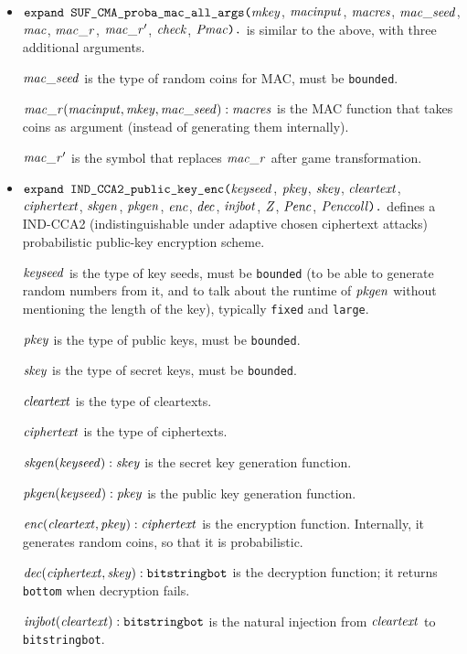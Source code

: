 \documentclass{article}
\begin{document}
\begin{itemize}
\item $\texttt{expand SUF\_CMA\_proba\_mac\_all\_args(}\mathit{mkey}$,
$  \mathit{macinput}$, $\mathit{macres}$, $\mathit{mac\_seed}$, $\mathit{mac}$, $\mathit{mac\_r}$, $\mathit{mac\_r}'$, $\mathit{check}$, 
  $\mathit{Pmac}\texttt{).}$ is similar to the above,
  with three additional arguments. 

  $\mathit{mac\_seed}$ is the type of random coins for MAC, must be \texttt{bounded}.

  $\mathit{mac\_r}(\mathit{macinput}, \mathit{mkey}, \mathit{mac\_seed}): \mathit{macres}$ is the MAC function that takes coins as argument (instead of generating them internally).

  $\mathit{mac\_r}'$ is the symbol that replaces $\mathit{mac\_r}$ after game transformation.

\item $\texttt{expand IND\_CCA2\_public\_key\_enc(}\mathit{keyseed}$, $\mathit{pkey}$, $\mathit{skey}$,
$  \mathit{cleartext}$, $\mathit{ciphertext}$, $\mathit{skgen}$, $\mathit{pkgen}$, $\mathit{enc}$, $\mathit{dec}$, $\mathit{injbot}$, $\mathit{Z}$, $\mathit{Penc}$, $\mathit{Penccoll}\texttt{).}$ defines a
  IND-CCA2 (indistinguishable under adaptive chosen ciphertext attacks)
  probabilistic public-key encryption scheme.

  $\mathit{keyseed}$ is the type of key seeds, must be \texttt{bounded}
  (to be able to generate random numbers from it, and to talk about
  the runtime of $\mathit{pkgen}$ without mentioning the length of the key),
  typically \texttt{fixed} and \texttt{large}.

   $\mathit{pkey}$ is the type of public keys, must be \texttt{bounded}.

   $\mathit{skey}$ is the type of secret keys, must be \texttt{bounded}.

   $\mathit{cleartext}$ is the type of cleartexts.

   $\mathit{ciphertext}$ is the type of ciphertexts.

   $\mathit{skgen}(\mathit{keyseed}): \mathit{skey}$ is the secret key generation function.

   $\mathit{pkgen}(\mathit{keyseed}): \mathit{pkey}$ is the public key generation function.

   $\mathit{enc}(\mathit{cleartext}, \mathit{pkey}): \mathit{ciphertext}$ is the encryption function. Internally, it generates random coins, so that it is probabilistic.

   $\mathit{dec}(\mathit{ciphertext}, \mathit{skey}): \texttt{bitstringbot}$ is the
  decryption function; it returns \texttt{bottom} when decryption
  fails.

   $\mathit{injbot}(\mathit{cleartext}): \texttt{bitstringbot}$ is the natural
  injection from $\mathit{cleartext}$ to \texttt{bitstringbot}.


\end{itemize}
\end{document}
